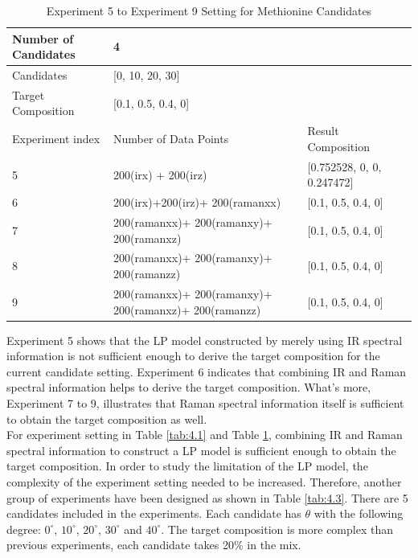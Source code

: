 \begin{table}\tiny \label{tab:4.2}
\begin{center}
\begin{tabular}{| l | l | l | l }
\hline
Number of Candidates & \multicolumn{2}{l|}{4} \\ \hline
Candidates & \multicolumn{2}{l|}{[0, 10, 20, 30]} \\ \hline
Target Composition & \multicolumn{2}{l|}{[0.1, 0.5, 0.4, 0]} \\ \hline
Experiment index & Number of Data Points & Result Composition \\ \hline
5 & 200(irx) + 200(irz) & [0.752528, 0, 0, 0.247472]  \\ \hline
6 & 200(irx)+200(irz)+ 200(ramanxx) & [0.1, 0.5, 0.4, 0] \\ \hline
7 & 200(ramanxx)+ 200(ramanxy)+ 200(ramanxz) & [0.1, 0.5, 0.4, 0] \\ \hline
8 & 200(ramanxx)+ 200(ramanxy)+ 200(ramanzz) & [0.1, 0.5, 0.4, 0] \\ \hline
9 & 200(ramanxx)+ 200(ramanxy)+ 200(ramanxz)+ 200(ramanzz)   & [0.1, 0.5, 0.4, 0] \\ \hline
\end{tabular} 
\end{center}
\caption{Experiment 5 to Experiment 9 Setting for Methionine Candidates}
\end{table}	

Experiment 5 shows that the LP model constructed by merely using IR spectral information is not sufficient enough to derive the target composition for the current candidate setting. Experiment 6 indicates that combining IR and Raman spectral information helps to derive the target composition. What's more, Experiment  7 to 9, illustrates that Raman spectral information itself is sufficient to obtain the target composition as well. \\

For experiment setting in Table \ref{tab:4.1} and Table \ref{tab:4.2}, combining IR and Raman spectral information to construct a LP model is sufficient enough to obtain the target composition. In order to study the limitation of the LP model, the complexity of the experiment setting needed to be increased. Therefore, another group of experiments have been designed as shown in Table \ref{tab:4.3}. There are 5 candidates included in the experiments. Each candidate has $\theta$ with the following degree: $0^{\circ}$, $10^{\circ}$, $20^{\circ}$, $30^{\circ}$ and $40^{\circ}$. The target composition is more complex than previous experiments, each candidate takes 20\% in the mix. \\

